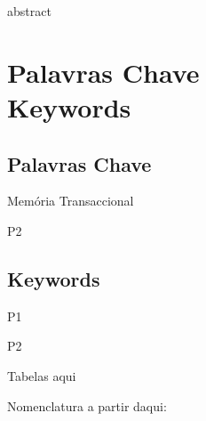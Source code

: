 abstract


\newpage
\thispagestyle{empty}


\chapter*{Palavras Chave \\ Keywords}
\thispagestyle{empty}

\section*{Palavras Chave}
{\large

\noindent Memória Transaccional

\noindent P2

}

\section*{Keywords}

{\large

\noindent P1

\noindent P2

}

\newpage
\thispagestyle{empty}

\cleardoublepage



\tableofcontents
\newpage

\listoffigures
\newpage

\listoftables
Tabelas aqui
\newpage

Nomenclatura a partir daqui:
\printnomenclature
\cleardoublepage



